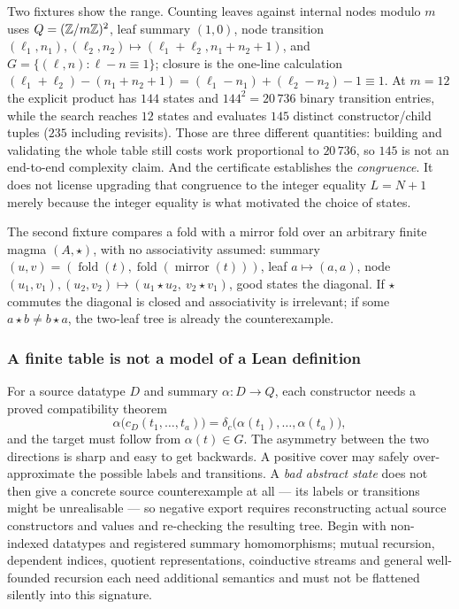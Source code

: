Two fixtures show the range. Counting leaves against internal nodes modulo $m$
uses $Q=(\mathbb{Z}/m\mathbb{Z})^2$, leaf summary $(1,0)$, node transition
$(\ell_1,n_1),(\ell_2,n_2)\mapsto(\ell_1+\ell_2,n_1+n_2+1)$, and
$G=\{(\ell,n):\ell-n\equiv1\}$; closure is the one-line calculation
$(\ell_1+\ell_2)-(n_1+n_2+1)=(\ell_1-n_1)+(\ell_2-n_2)-1\equiv1$. At $m=12$ the
explicit product has $144$ states and $144^2=20\,736$ binary transition entries,
while the search reaches $12$ states and evaluates $145$ distinct
constructor/child tuples ($235$ including revisits). Those are three different
quantities: building and validating the whole table still costs work
proportional to $20\,736$, so $145$ is not an end-to-end complexity claim. And
the certificate establishes the \emph{congruence}. It does not license
upgrading that congruence to the integer equality $L=N+1$ merely because the
integer equality is what motivated the choice of states.

The second fixture compares a fold with a mirror fold over an arbitrary finite
magma $(A,\star)$, with no associativity assumed: summary
$(u,v)=(\operatorname{fold}(t),\operatorname{fold}(\operatorname{mirror}(t)))$,
leaf $a\mapsto(a,a)$, node
$(u_1,v_1),(u_2,v_2)\mapsto(u_1\star u_2,\ v_2\star v_1)$, good states the
diagonal. If $\star$ commutes the diagonal is closed and associativity is
irrelevant; if some $a\star b\ne b\star a$, the two-leaf tree is already the
counterexample.

\subsubsection*{A finite table is not a model of a Lean definition}

For a source datatype $D$ and summary $\alpha:D\to Q$, each constructor needs a
proved compatibility theorem
\[
 \alpha\bigl(c_D(t_1,\ldots,t_a)\bigr)=
 \delta_c\bigl(\alpha(t_1),\ldots,\alpha(t_a)\bigr),
\]
and the target must follow from $\alpha(t)\in G$. The asymmetry between the two
directions is sharp and easy to get backwards. A positive cover may safely
over-approximate the possible labels and transitions. A \emph{bad abstract
state} does not then give a concrete source counterexample at all --- its
labels or transitions might be unrealisable --- so negative export requires
reconstructing actual source constructors and values and re-checking the
resulting tree. Begin with non-indexed datatypes and registered summary
homomorphisms; mutual recursion, dependent indices, quotient representations,
coinductive streams and general well-founded recursion each need additional
semantics and must not be flattened silently into this signature.

